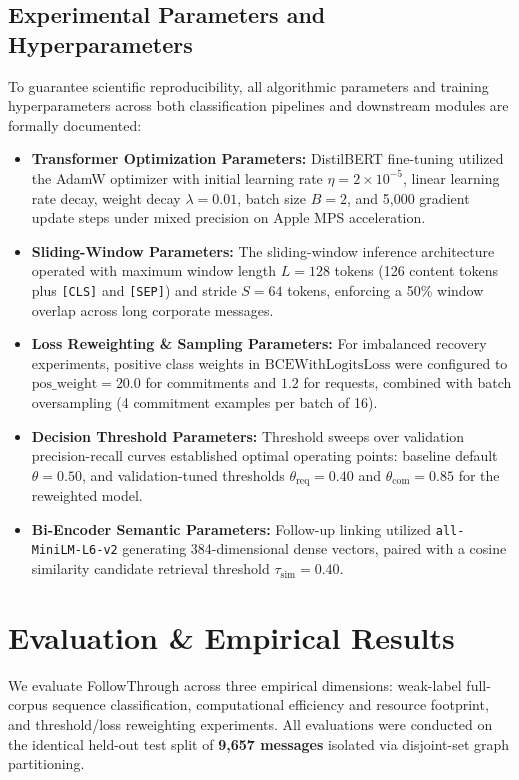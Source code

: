 \documentclass[conference]{IEEEtran}
\begin{document}
\subsection{Experimental Parameters and Hyperparameters}
To guarantee scientific reproducibility, all algorithmic parameters and training hyperparameters across both classification pipelines and downstream modules are formally documented:
\begin{itemize}
    \item \textbf{Transformer Optimization Parameters:} DistilBERT fine-tuning utilized the AdamW optimizer with initial learning rate $\eta = 2 \times 10^{-5}$, linear learning rate decay, weight decay $\lambda = 0.01$, batch size $B = 2$, and 5,000 gradient update steps under mixed precision on Apple MPS acceleration.
    \item \textbf{Sliding-Window Parameters:} The sliding-window inference architecture operated with maximum window length $L = 128$ tokens (126 content tokens plus \texttt{[CLS]} and \texttt{[SEP]}) and stride $S = 64$ tokens, enforcing a 50\% window overlap across long corporate messages.
    \item \textbf{Loss Reweighting \& Sampling Parameters:} For imbalanced recovery experiments, positive class weights in $\text{BCEWithLogitsLoss}$ were configured to $\text{pos\_weight} = 20.0$ for commitments and $1.2$ for requests, combined with batch oversampling (4 commitment examples per batch of 16).
    \item \textbf{Decision Threshold Parameters:} Threshold sweeps over validation precision-recall curves established optimal operating points: baseline default $\theta = 0.50$, and validation-tuned thresholds $\theta_{\text{req}} = 0.40$ and $\theta_{\text{com}} = 0.85$ for the reweighted model.
    \item \textbf{Bi-Encoder Semantic Parameters:} Follow-up linking utilized \texttt{all-MiniLM-L6-v2} generating 384-dimensional dense vectors, paired with a cosine similarity candidate retrieval threshold $\tau_{\text{sim}} = 0.40$.
\end{itemize}

\section{Evaluation \& Empirical Results}
We evaluate FollowThrough across three empirical dimensions: weak-label full-corpus sequence classification, computational efficiency and resource footprint, and threshold/loss reweighting experiments. All evaluations were conducted on the identical held-out test split of \textbf{9,657 messages} isolated via disjoint-set graph partitioning.
\end{document}
